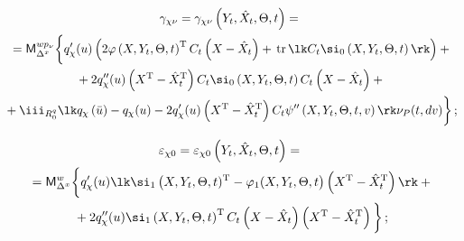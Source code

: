     \begin{multline*}

    \gamma_{\chi \nu}=

    \gamma_{\chi \nu} \left(Y_t,\hat X_t,\Theta,t\right) ={}\\

    {}=

    {\sf M}_{\Delta^x}^{w p_\nu} \bigg\{

    q_\chi'(u) \left(2\varphi \left(X,Y_t,\Theta,t\right)^{\mathrm{T}} 

    C_t\left(X-\hat X_t\right)+\,\mathrm{tr}\, \lk C_t\si_0 \left(X,Y_t,\Theta,t\right)\rk \right)

    +{}\\

{}+ 2q_\chi'' (u)\left(X^{\mathrm{T}}-\hat X_t^{\mathrm{T}}\right) C_t\si_0

    \left(X,Y_t,\Theta,t\right) C_t\left(X-\hat X_t\right)+{}\\

{}+\iii_{R_0^q} \lk q_\chi \left(\bar u\right) -q_\chi(u) - 2q_\chi' (u) 

\left(X^{\mathrm{T}}-\hat X_t^{\mathrm{T}}\right) 

C_t \psi'' \left(X,Y_t,\Theta,t,v\right)\rk \nu_P (t,dv)\bigg\}\,;


\end{multline*}




    

    \noindent

    \begin{multline*}

    \varepsilon_{\chi 0}= \varepsilon_{\chi 0} \left(Y_t,\hat X_t,\Theta,t\right)

    ={}\\

    {}={\sf M}_{\Delta^x}^{w}\bigg\{ 

               q_\chi '(u) \lk \si_1 \left(X,Y_t,\Theta,t)^{\mathrm{T}}

    -\varphi_1 (X,Y_t,\Theta,t\right) \left(X^{\mathrm{T}}-\hat X_t^{\mathrm{T}}

    \right)\rk+{}\\

{}+ 2q_\chi'' (u)\si_1 \left(X,Y_t,\Theta,t\right)^{\mathrm{T}} C_t

\left(X-\hat X_t\right)\left(X^{\mathrm{T}}-\hat X_t^{\mathrm{T}}\right)\bigg\}\,;


\end{multline*}



